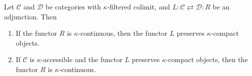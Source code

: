 \documentclass[a4paper,dvipdfmx,11pt,reqno]{amsart}
\newcommand{\C}{\mathcal{C}}
\newcommand{\D}{\mathcal{D}}
\newcommand{\CAT}{\mathrm{CAT}}
\newcommand{\PrL}{\mathrm{Pr}^{\mathrm{L}}}
\begin{document}
\begin{proposition}
  Let $\C$ and $\D$ be categories with $\kappa$-filtered colimit, and $L : \C \rightleftarrows \D : R$ be an adjunction.
  Then 
  \begin{enumerate}
    \item If the functor $R$ is $\kappa$-continuous, then the functor $L$ preserves $\kappa$-compact objects.
    \item If $\C$ is $\kappa$-accessible and the functor $L$ preserves $\kappa$-compact objects, then the functor $R$ is $\kappa$-continuous.
  \end{enumerate}
\end{proposition}







  
\end{document}
